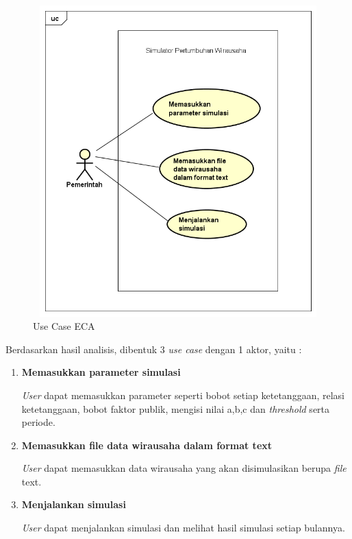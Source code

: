 	\begin{figure} [H]
		\centering  
		\includegraphics[width=14cm, height=12cm]{UseCase2} 
		\caption[Use Case ECA]{Use Case ECA} 
		\label{fig:usecase} 
	\end{figure}
	
Berdasarkan hasil analisis, dibentuk 3 \textit{use case} dengan 1 aktor, yaitu :
\begin{enumerate}
	\item \textbf{Memasukkan parameter simulasi}
	
	\textit{User} dapat memasukkan parameter seperti bobot setiap ketetanggaan, relasi ketetanggaan, bobot faktor publik, mengisi nilai a,b,c dan \textit{threshold} serta periode.
	\item \textbf{Memasukkan file data wirausaha dalam format text}
	
	\textit{User} dapat memasukkan data wirausaha yang akan disimulasikan berupa \textit{file} text.
	\item \textbf{Menjalankan simulasi}
	
	\textit{User} dapat menjalankan simulasi dan melihat hasil simulasi setiap bulannya.
\end{enumerate}

